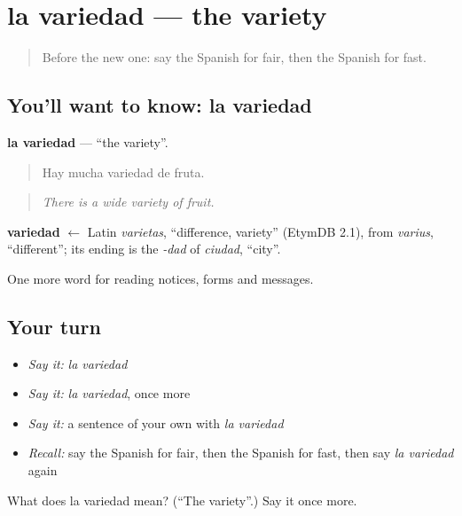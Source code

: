 \section[la variedad]{la variedad — the variety}

\label{lesson:ES-C482-variedad}



\begin{quote}
Before the new one: say the Spanish for fair, then the Spanish for fast.
\end{quote}

\subsection*{You'll want to know: la variedad}
\textbf{la variedad} — \textquotedblleft{}the variety\textquotedblright{}.

\begin{quote}
Hay mucha variedad de fruta.
\end{quote}

\begin{quote}
\emph{There is a wide variety of fruit.}
\end{quote}

\begin{cousinweb}
\textbf{variedad} $\leftarrow$ Latin \emph{varietas}, \textquotedblleft{}difference, variety\textquotedblright{} (EtymDB 2.1), from \emph{varius}, \textquotedblleft{}different\textquotedblright{}; its ending is the \emph{-dad} of \emph{ciudad}, \textquotedblleft{}city\textquotedblright{}.
\end{cousinweb}

\begin{grammarlens}[title={What you've built}]
One more word for reading notices, forms and messages.
\end{grammarlens}

\subsection*{Your turn}
\begin{itemize}
\raggedright
  \item \emph{Say it:} \emph{la variedad}
  \item \emph{Say it:} \emph{la variedad}, once more
  \item \emph{Say it:} a sentence of your own with \emph{la variedad}
  \item \emph{Recall:} say the Spanish for fair, then the Spanish for fast, then say \emph{la variedad} again
\end{itemize}

\begin{tcolorbox}[breakable,colback=teal!4,colframe=teal!35!black,title={Before you move on}]
What does la variedad mean? (\textquotedblleft{}The variety\textquotedblright{}.) Say it once more.
\end{tcolorbox}
